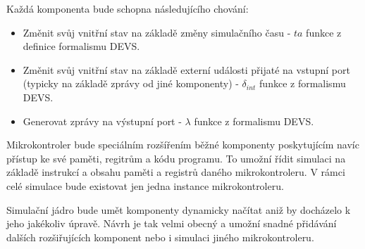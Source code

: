 Každá komponenta bude schopna následujícího chování:

\begin{itemize}
\item Změnit svůj vnitřní stav na základě změny simulačního času - $ta$ funkce z definice formalismu DEVS.
\item Změnit svůj vnitřní stav na základě externí události přijaté na vstupní port (typicky na základě zprávy od jiné komponenty) - $\delta_{int}$ funkce z formalismu DEVS.
\item Generovat zprávy na výstupní port - $\lambda$ funkce z formalismu DEVS.
\end{itemize}

Mikrokontroler bude speciálním rozšířením běžné komponenty poskytujícím navíc přístup ke své paměti, regitrům a kódu programu. To umožní řídit simulaci na základě instrukcí a obsahu paměti a registrů daného mikrokontroleru. V rámci celé simulace bude existovat jen jedna instance mikrokontroleru.

Simulační jádro bude umět komponenty dynamicky načítat aniž by docházelo k jeho jakékoliv úpravě. Návrh je tak velmi obecný a umožní snadné přidávání dalších rozšiřujících komponent nebo i simulaci jiného mikrokontroleru.


